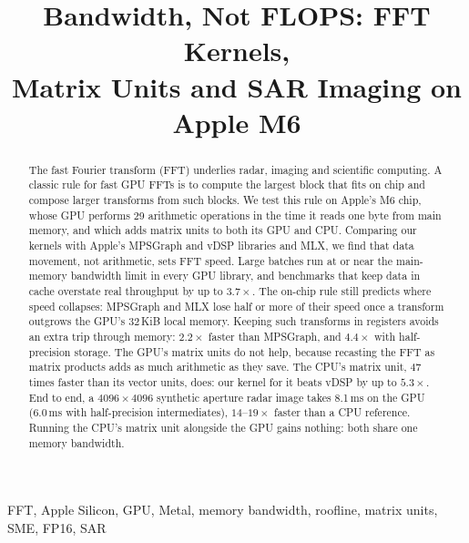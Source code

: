 \documentclass[conference]{IEEEtran}
\begin{document}

\title{Bandwidth, Not FLOPS: FFT Kernels,\\Matrix Units and SAR Imaging on Apple M6}

\author{
}

\maketitle

\begin{abstract}
The fast Fourier transform (FFT) underlies radar, imaging and scientific computing. A classic rule
for fast GPU FFTs is to compute the largest block that fits on chip and compose larger transforms
from such blocks. We test this rule on Apple's M6 chip, whose GPU performs 29
arithmetic operations in the time it reads one byte from main memory, and which adds matrix
units to both its GPU and CPU. Comparing our kernels with Apple's MPSGraph and vDSP libraries and
MLX, we find that data movement, not arithmetic, sets FFT speed. Large batches run at
or near the main-memory bandwidth limit in every GPU library, and benchmarks that keep data in cache
overstate real throughput by up to $3.7\times$. The on-chip rule still predicts where speed
collapses: MPSGraph and MLX lose half or more of their speed once a transform outgrows the
GPU's 32\,KiB local memory. Keeping such transforms in registers avoids an extra trip through
memory: $2.2\times$ faster than MPSGraph, and $4.4\times$ with half-precision storage. The
GPU's matrix units do not help, because recasting the FFT as matrix products adds as much arithmetic
as they save. The CPU's matrix unit, 47 times faster than its vector units, does: our kernel for it
beats vDSP by up to $5.3\times$. End to end, a $4096\times4096$ synthetic aperture radar image takes
8.1\,ms on the GPU (6.0\,ms with half-precision intermediates), $14$--$19\times$ faster than a CPU
reference. Running the CPU's matrix unit alongside the GPU gains nothing: both share one memory
bandwidth.
\end{abstract}

\begin{IEEEkeywords}
FFT, Apple Silicon, GPU, Metal, memory bandwidth, roofline, matrix units, SME, FP16, SAR
\end{IEEEkeywords}
\end{document}
